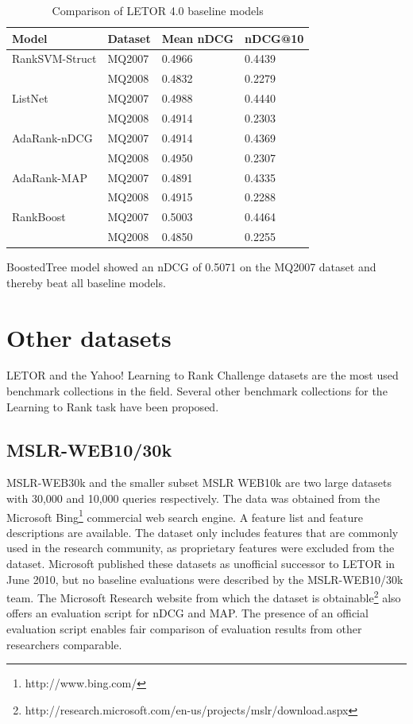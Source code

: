 \begin{table}
\begin{tabular}{l|lll}
Model & Dataset & Mean \ac{nDCG} & \ac{nDCG}@10 \\ 
\hline
Rank\ac{SVM}-Struct & MQ2007 & 0.4966 & 0.4439 \\ 
 & MQ2008 & 0.4832 & 0.2279 \\ 
\hline
ListNet & MQ2007 & 0.4988 & 0.4440 \\ 
 & MQ2008 & 0.4914 & 0.2303 \\ 
\hline
AdaRank-\ac{nDCG} & MQ2007 & 0.4914 & 0.4369 \\ 
 & MQ2008 & 0.4950 & 0.2307 \\ 
\hline
AdaRank-\ac{MAP} & MQ2007 & 0.4891 & 0.4335 \\ 
 & MQ2008 & 0.4915 & 0.2288 \\ 
\hline
RankBoost & MQ2007 & 0.5003 & 0.4464 \\ 
 & MQ2008 & 0.4850 & 0.2255 \\ 
\end{tabular}
\caption{Comparison of LETOR 4.0 baseline models}
\label{tab:letor4_baseline_results}
\end{table}

BoostedTree model \cite{Kocsis2013} showed an \ac{nDCG} of 0.5071 on the MQ2007 dataset and thereby beat all baseline models.

\section{Other datasets}
LETOR and the Yahoo! Learning to Rank Challenge datasets are the most used benchmark collections in the field. Several other benchmark collections for the Learning to Rank task have been proposed.

\subsection{MSLR-WEB10/30k}
MSLR-WEB30k and the smaller subset MSLR WEB10k are two large datasets with 30,000 and 10,000 queries respectively. The data was obtained from the Microsoft Bing\footnote{http://www.bing.com/} commercial web search engine. A feature list and feature descriptions are available. The dataset only includes features that are commonly used in the research community, as proprietary features were excluded from the dataset. Microsoft published these datasets as unofficial successor to LETOR in June 2010, but no baseline evaluations were described by the MSLR-WEB10/30k team. The Microsoft Research website from which the dataset is obtainable\footnote{http://research.microsoft.com/en-us/projects/mslr/download.aspx} also offers an evaluation script for \ac{nDCG} and \ac{MAP}. The presence of an official evaluation script enables fair comparison of evaluation results from other researchers comparable.

